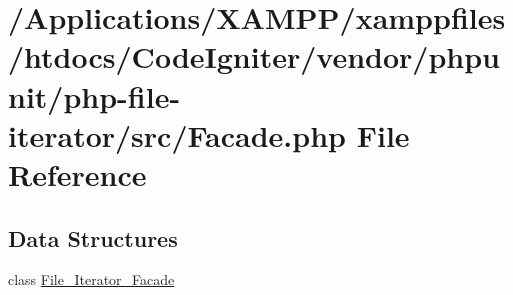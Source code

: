 \hypertarget{php-file-iterator_2src_2_facade_8php}{}\section{/\+Applications/\+X\+A\+M\+P\+P/xamppfiles/htdocs/\+Code\+Igniter/vendor/phpunit/php-\/file-\/iterator/src/\+Facade.php File Reference}
\label{php-file-iterator_2src_2_facade_8php}
\subsection*{Data Structures}
\begin{DoxyCompactItemize}
\item 
class \mbox{\hyperlink{class_file___iterator___facade}{File\+\_\+\+Iterator\+\_\+\+Facade}}
\end{DoxyCompactItemize}
